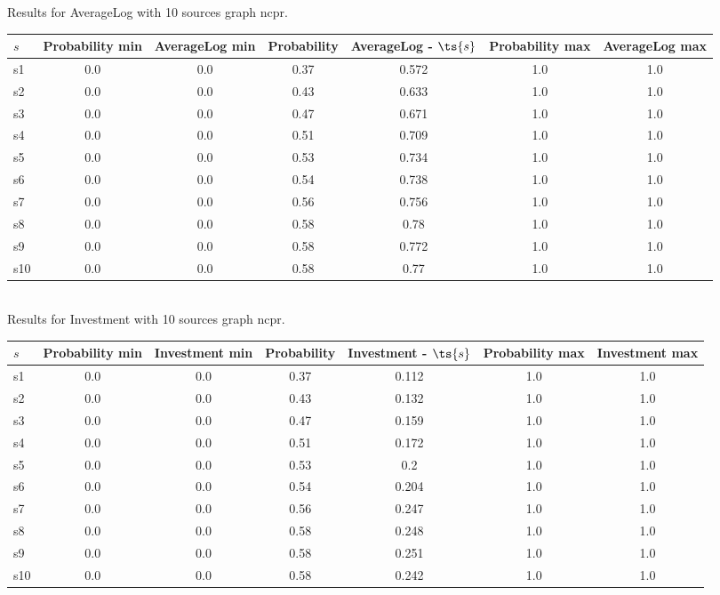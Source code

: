 \documentclass{article}
\begin{document}
\noindent Results for AverageLog with 10 sources graph ncpr.

\noindent\begin{tabular}{|l|c|c|c|c|c|c|}
\hline
$s$& Probability min & AverageLog min & Probability & AverageLog - $\ts{s}$ & Probability max & AverageLog max\\
\hline
s1 &0.0 & 0.0 & 0.37 & 0.572 & 1.0 & 1.0\\
\hline
s2 &0.0 & 0.0 & 0.43 & 0.633 & 1.0 & 1.0\\
\hline
s3 &0.0 & 0.0 & 0.47 & 0.671 & 1.0 & 1.0\\
\hline
s4 &0.0 & 0.0 & 0.51 & 0.709 & 1.0 & 1.0\\
\hline
s5 &0.0 & 0.0 & 0.53 & 0.734 & 1.0 & 1.0\\
\hline
s6 &0.0 & 0.0 & 0.54 & 0.738 & 1.0 & 1.0\\
\hline
s7 &0.0 & 0.0 & 0.56 & 0.756 & 1.0 & 1.0\\
\hline
s8 &0.0 & 0.0 & 0.58 & 0.78 & 1.0 & 1.0\\
\hline
s9 &0.0 & 0.0 & 0.58 & 0.772 & 1.0 & 1.0\\
\hline
s10 &0.0 & 0.0 & 0.58 & 0.77 & 1.0 & 1.0\\
\hline
\end{tabular}\\

\noindent Results for Investment with 10 sources graph ncpr.

\noindent\begin{tabular}{|l|c|c|c|c|c|c|}
\hline
$s$& Probability min & Investment min & Probability & Investment - $\ts{s}$ & Probability max & Investment max\\
\hline
s1 &0.0 & 0.0 & 0.37 & 0.112 & 1.0 & 1.0\\
\hline
s2 &0.0 & 0.0 & 0.43 & 0.132 & 1.0 & 1.0\\
\hline
s3 &0.0 & 0.0 & 0.47 & 0.159 & 1.0 & 1.0\\
\hline
s4 &0.0 & 0.0 & 0.51 & 0.172 & 1.0 & 1.0\\
\hline
s5 &0.0 & 0.0 & 0.53 & 0.2 & 1.0 & 1.0\\
\hline
s6 &0.0 & 0.0 & 0.54 & 0.204 & 1.0 & 1.0\\
\hline
s7 &0.0 & 0.0 & 0.56 & 0.247 & 1.0 & 1.0\\
\hline
s8 &0.0 & 0.0 & 0.58 & 0.248 & 1.0 & 1.0\\
\hline
s9 &0.0 & 0.0 & 0.58 & 0.251 & 1.0 & 1.0\\
\hline
s10 &0.0 & 0.0 & 0.58 & 0.242 & 1.0 & 1.0\\
\hline
\end{tabular}\\
\end{document}
